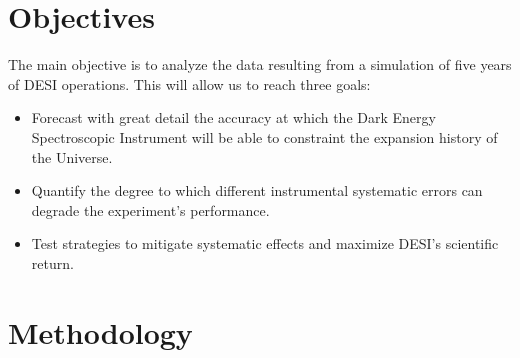 \documentclass[12pt]{article}
\begin{document}
 



{}




\section*{Objectives}

The main objective is to analyze the data resulting from a simulation
of five years of DESI operations.  
This will allow us to reach three goals:

\begin{itemize}
\item Forecast with great detail the accuracy at which the Dark Energy
  Spectroscopic Instrument will be able to constraint the expansion
  history of the Universe.  
\item Quantify the degree to which different instrumental systematic
  errors can degrade the experiment's performance.
\item Test strategies to mitigate systematic effects and maximize
  DESI's scientific return.
\end{itemize}


\section*{Methodology}
\end{document}
